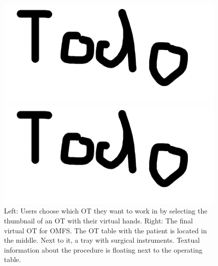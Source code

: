 \begin{figure}[ht]
  \centering
  \begin{minipage}{.5\textwidth}
    \centering
    \includegraphics[width=0.95\linewidth]{images/todo.png}
  \end{minipage}%
  \begin{minipage}{.5\textwidth}
    \centering
    \includegraphics[width=0.95\linewidth]{images/todo.png}
  \end{minipage}
  \caption{\label{fig::SceneSelect} Left: Users choose which OT they want to work in by selecting the thumbnail of an OT with their virtual hands. Right: The final virtual OT for OMFS. 
  The OT table with the patient is located in the middle. Next to it, a tray with surgical instruments.
  Textual information about the procedure is floating next to the operating table.}
\end{figure}

